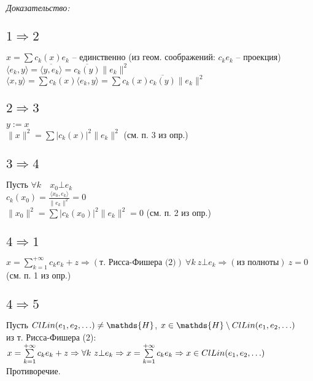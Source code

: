 \documentclass[paper=a4, fontsize=14pt]{report}
\begin{document}
    \emph{Доказательство:}

\subsection{\texorpdfstring{$1 \Rightarrow 2$}{TEXT}}
$x=\sum c_k(x) e_k$ -- единственно (из геом. соображений: $c_k e_k$ -- проекция)\\
$\langle e_k, y \rangle = \overline{\langle y, e_k \rangle} = \overline{c_k(y)}\|e_k\|^2$\\
$\langle x, y \rangle = \sum c_k(x) \langle e_k, y \rangle = \sum c_k(x)\overline{c_k(y)}\|e_k\|^2$

\subsection{\texorpdfstring{$2 \Rightarrow 3$}{TEXT}}
$y:=x$\\
$\|x\|^2=\sum \vert c_k(x) \vert ^2 \|e_k\|^2$ (см. п. 3 из опр.)

\subsection{\texorpdfstring{$3 \Rightarrow 4$}{TEXT}}
Пусть $\forall k \quad x_0 \bot e_k$\\
$c_k(x_0)=\frac{\langle x_0, e_k \rangle}{\|e_k\|^2}=0$\\
$\|x_0\|^2=\sum \vert c_k(x_0) \vert^2 \|e_k\|^2 = 0$ (см. п. 2 из опр.)

\subsection{\texorpdfstring{$4 \Rightarrow 1$}{TEXT}}
$x =\sum\limits_{k=1}^{+\infty} c_k e_k + z \Rightarrow(\text{т. Рисса-Фишера (2)}) \  \forall k \ z \bot e_k \Rightarrow(\text{из полноты}) \ z = 0$ (см. п. 1 из опр.)

\subsection{\texorpdfstring{$4 \Rightarrow 5$}{TEXT}}
Пусть $Cl Lin(e_1, e_2, \mathellipsis) \ne \mathds{H}$, $x \in \mathds{H} \setminus Cl Lin(e_1, e_2, \mathellipsis)$\\
из т. Рисса-Фишера (2): $x =\sum\limits_{k=1}^{+\infty} c_k e_k + z \Rightarrow \forall k \ z \bot e_k \Rightarrow x =\sum\limits_{k=1}^{+\infty} c_k e_k \Rightarrow x \in Cl Lin(e_1, e_2, \mathellipsis)$\\
Противоречие.
\end{document}
